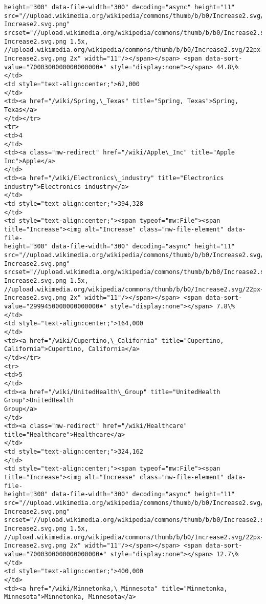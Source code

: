 \documentclass[11pt]{article}
\begin{document}
\begin{Verbatim}[commandchars=\\\{\}]
height="300" data-file-width="300" decoding="async" height="11"
src="//upload.wikimedia.org/wikipedia/commons/thumb/b/b0/Increase2.svg/11px-
Increase2.svg.png"
srcset="//upload.wikimedia.org/wikipedia/commons/thumb/b/b0/Increase2.svg/17px-
Increase2.svg.png 1.5x,
//upload.wikimedia.org/wikipedia/commons/thumb/b/b0/Increase2.svg/22px-
Increase2.svg.png 2x" width="11"/></span></span> <span data-sort-
value="7000300000000000000♠" style="display:none"></span> 44.8\%
</td>
<td style="text-align:center;">62,000
</td>
<td><a href="/wiki/Spring,\_Texas" title="Spring, Texas">Spring, Texas</a>
</td></tr>
<tr>
<td>4
</td>
<td><a class="mw-redirect" href="/wiki/Apple\_Inc" title="Apple Inc">Apple</a>
</td>
<td><a href="/wiki/Electronics\_industry" title="Electronics
industry">Electronics industry</a>
</td>
<td style="text-align:center;">394,328
</td>
<td style="text-align:center;"><span typeof="mw:File"><span
title="Increase"><img alt="Increase" class="mw-file-element" data-file-
height="300" data-file-width="300" decoding="async" height="11"
src="//upload.wikimedia.org/wikipedia/commons/thumb/b/b0/Increase2.svg/11px-
Increase2.svg.png"
srcset="//upload.wikimedia.org/wikipedia/commons/thumb/b/b0/Increase2.svg/17px-
Increase2.svg.png 1.5x,
//upload.wikimedia.org/wikipedia/commons/thumb/b/b0/Increase2.svg/22px-
Increase2.svg.png 2x" width="11"/></span></span> <span data-sort-
value="2999450000000000000♠" style="display:none"></span> 7.8\%
</td>
<td style="text-align:center;">164,000
</td>
<td><a href="/wiki/Cupertino,\_California" title="Cupertino,
California">Cupertino, California</a>
</td></tr>
<tr>
<td>5
</td>
<td><a href="/wiki/UnitedHealth\_Group" title="UnitedHealth Group">UnitedHealth
Group</a>
</td>
<td><a class="mw-redirect" href="/wiki/Healthcare"
title="Healthcare">Healthcare</a>
</td>
<td style="text-align:center;">324,162
</td>
<td style="text-align:center;"><span typeof="mw:File"><span
title="Increase"><img alt="Increase" class="mw-file-element" data-file-
height="300" data-file-width="300" decoding="async" height="11"
src="//upload.wikimedia.org/wikipedia/commons/thumb/b/b0/Increase2.svg/11px-
Increase2.svg.png"
srcset="//upload.wikimedia.org/wikipedia/commons/thumb/b/b0/Increase2.svg/17px-
Increase2.svg.png 1.5x,
//upload.wikimedia.org/wikipedia/commons/thumb/b/b0/Increase2.svg/22px-
Increase2.svg.png 2x" width="11"/></span></span> <span data-sort-
value="7000300000000000000♠" style="display:none"></span> 12.7\%
</td>
<td style="text-align:center;">400,000
</td>
<td><a href="/wiki/Minnetonka,\_Minnesota" title="Minnetonka,
Minnesota">Minnetonka, Minnesota</a>

\end{Verbatim}
\end{document}
